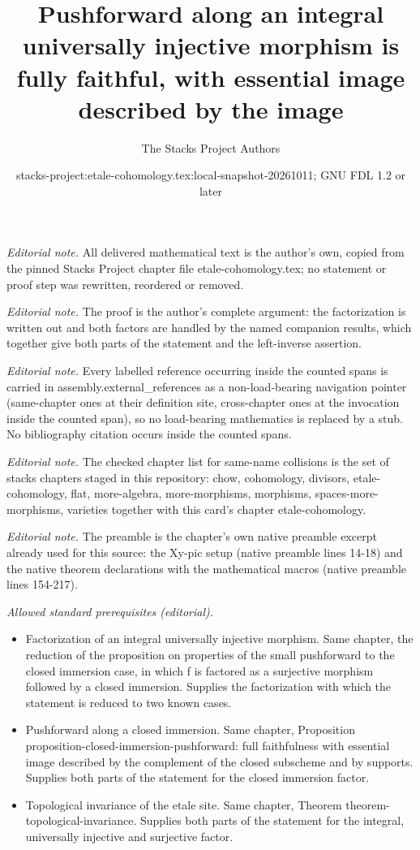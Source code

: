 \documentclass[10pt,a4paper]{amsart}
\title{Pushforward along an integral universally injective morphism is fully faithful, with essential image described by the image}
\author{The Stacks Project Authors}
\date{stacks-project:etale-cohomology.tex:local-snapshot-20261011; GNU FDL 1.2 or later}
\theoremstyle{plain}
\theoremstyle{definition}
\theoremstyle{remark}
\numberwithin{equation}{subsection}
\begin{document}
\maketitle
\noindent\textit{Editorial note.} All delivered mathematical text is the author's own, copied from the pinned Stacks Project chapter file etale-cohomology.tex; no statement or proof step was rewritten, reordered or removed.\par\medskip
\noindent\textit{Editorial note.} The proof is the author's complete argument: the factorization is written out and both factors are handled by the named companion results, which together give both parts of the statement and the left-inverse assertion.\par\medskip
\noindent\textit{Editorial note.} Every labelled reference occurring inside the counted spans is carried in assembly.external\_references as a non-load-bearing navigation pointer (same-chapter ones at their definition site, cross-chapter ones at the invocation inside the counted span), so no load-bearing mathematics is replaced by a stub. No bibliography citation occurs inside the counted spans.\par\medskip
\noindent\textit{Editorial note.} The checked chapter list for same-name collisions is the set of stacks chapters staged in this repository: chow, cohomology, divisors, etale-cohomology, flat, more-algebra, more-morphisms, morphisms, spaces-more-morphisms, varieties together with this card's chapter etale-cohomology.\par\medskip
\noindent\textit{Editorial note.} The preamble is the chapter's own native preamble excerpt already used for this source: the Xy-pic setup (native preamble lines 14-18) and the native theorem declarations with the mathematical macros (native preamble lines 154-217).\par\medskip
\noindent\textit{Allowed standard prerequisites (editorial).}\begin{itemize}
\item Factorization of an integral universally injective morphism. Same chapter, the reduction of the proposition on properties of the small pushforward to the closed immersion case, in which f is factored as a surjective morphism followed by a closed immersion. Supplies the factorization with which the statement is reduced to two known cases.
\item Pushforward along a closed immersion. Same chapter, Proposition proposition-closed-immersion-pushforward: full faithfulness with essential image described by the complement of the closed subscheme and by supports. Supplies both parts of the statement for the closed immersion factor.
\item Topological invariance of the etale site. Same chapter, Theorem theorem-topological-invariance. Supplies both parts of the statement for the integral, universally injective and surjective factor.
\end{itemize}\medskip
\end{document}
